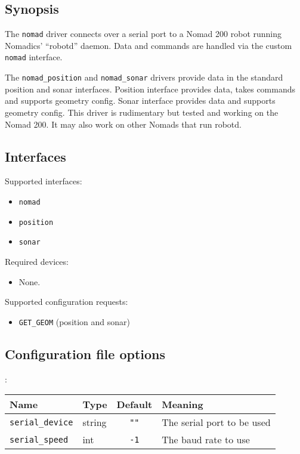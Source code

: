 \subsection*{Synopsis}
The {\tt nomad} driver connects over a serial port to a Nomad 200
robot running Nomadics' ``robotd'' daemon.   Data and commands are handled
via the custom {\tt nomad} interface.

The {\tt nomad\_position} and {\tt nomad\_sonar} drivers provide data in
the standard position and sonar interfaces.  Position interface provides
data, takes commands and supports geometry config.  Sonar interface
provides data and supports geometry config. This driver is rudimentary
but tested and working on the Nomad 200. It may also work on other Nomads
that run robotd.

\subsection*{Interfaces}

\noindent Supported interfaces:
\begin{itemize}
\item {\tt nomad}
\item {\tt position}
\item {\tt sonar}
\end{itemize}

\noindent Required devices:
\begin{itemize}
\item None.
\end{itemize}

\noindent Supported configuration requests:
\begin{itemize}
\item {\tt GET\_GEOM} (position and sonar)
\end{itemize}

\subsection*{Configuration file options}

:\\
\begin{center}
{\small \begin{tabularx}{\columnwidth}{|l|l|c|X|}
\hline
Name & Type & Default & Meaning\\
\hline
{\tt serial\_device} & string & {\tt ""} & The serial port to be used\\
{\tt serial\_speed} & int & {\tt -1} & The baud rate to use \\
\hline
\end{tabularx}}
\end{center}

